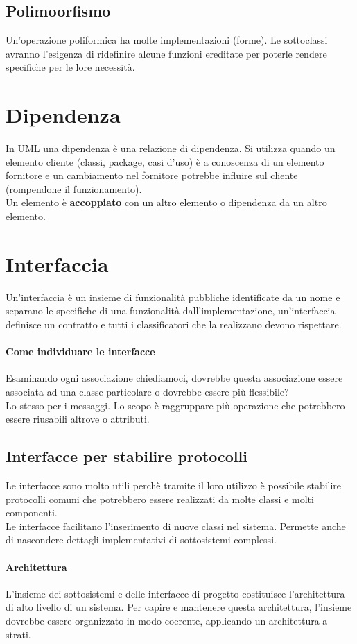 \subsection*{Polimoorfismo}
Un'operazione poliformica ha molte implementazioni (forme).
Le sottoclassi avranno l'esigenza di ridefinire alcune funzioni ereditate per poterle
rendere specifiche per le lore necessità.
\section{Dipendenza}
In UML una dipendenza è una relazione di dipendenza.
Si utilizza quando un elemento cliente (classi, package, casi d'uso) è a conoscenza di
un elemento fornitore e un cambiamento nel fornitore potrebbe influire sul cliente (rompendone il funzionamento).
\\ Un elemento è \textbf{accoppiato} con un altro elemento o dipendenza da un altro elemento.
\section{Interfaccia}
Un'interfaccia è un insieme di funzionalità pubbliche identificate da un nome e separano
le specifiche di una funzionalità dall'implementazione, un'interfaccia definisce un contratto
e tutti i classificatori che la realizzano devono rispettare.
\paragraph*{Come individuare le interfacce}
Esaminando ogni associazione chiediamoci, dovrebbe questa associazione essere associata ad 
una classe particolare o dovrebbe essere più flessibile?
\\ Lo stesso per i messaggi. Lo scopo è raggruppare più operazione che potrebbero essere
riusabili altrove o attributi.
\subsection*{Interfacce per stabilire protocolli}
Le interfacce sono molto utili perchè tramite il loro utilizzo è possibile stabilire protocolli
comuni che potrebbero essere realizzati da molte classi e molti componenti.
\\ Le interfacce facilitano l'inserimento di nuove classi nel sistema. Permette
anche di nascondere dettagli implementativi di sottosistemi complessi.
\paragraph*{Architettura} L'insieme dei sottosistemi e delle interfacce di progetto
costituisce l'architettura di alto livello di un sistema. Per capire e mantenere questa
architettura, l'insieme dovrebbe essere organizzato in modo coerente, applicando un 
architettura a strati.
